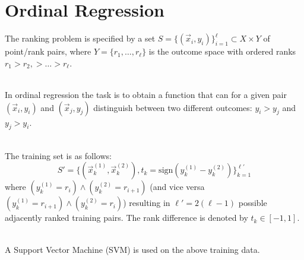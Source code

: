 
\section{Ordinal Regression}

The ranking problem is specified by a set $S =
\{(\vec{x}_i,y_i)\}_{i=1}^\ell \subset X \times Y$ of point/rank
pairs, where $Y=\{r_1,\ldots,r_\ell\}$ is the outcome space with
ordered ranks $r_1> r_2,> \ldots > r_\ell$.

\ \\ 
In ordinal regression the task is to obtain a function  that
can for a given pair $(\vec{x}_i,y_i)$ and $(\vec{x}_j,y_j)$
distinguish between two different outcomes: $y_i > y_j$ and $y_j
> y_i$.

\ \\
The training set is as follows:
$$S' = \big\{(\vec{x}_k^{(1)},
\vec{x}_k^{(2)}),t_k=\text{sign}(y_k^{(1)} -
y_k^{(2)})\big\}_{k=1}^{\ell'}$$
where $(y_k^{(1)} = r_i) \wedge
(y_k^{(2)} = r_{i+1})$ (and vice versa $(y_k^{(1)} = r_{i+1})
\wedge (y_k^{(2)} = r_{i})$) resulting in $\ell'=2(\ell-1)$
possible adjacently ranked training pairs. The rank difference
is denoted by $t_k\in[-1,1]$.

\ \\
A Support Vector Machine (SVM) is used on the above training
data.

\ \\